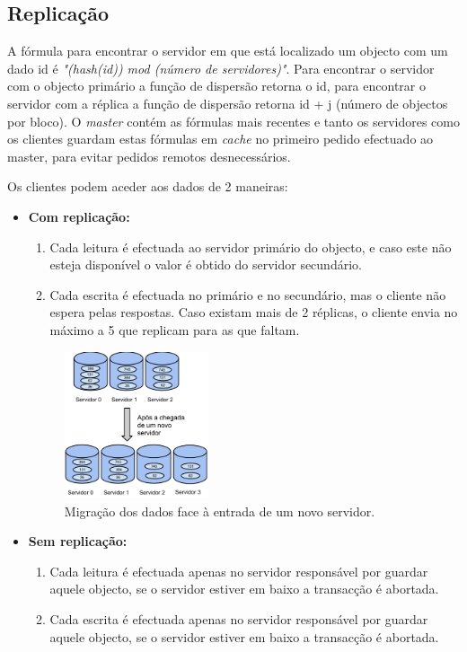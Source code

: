 \subsection{Replicação}

A fórmula para encontrar o servidor em que está localizado um objecto com um dado id é \textit{"(hash(id)) mod (número de servidores)"}. Para encontrar o servidor com o objecto primário a função de dispersão retorna o id, para encontrar o servidor com a réplica a função de dispersão retorna id + j (número de objectos por bloco).
O \textit{master} contém as fórmulas mais recentes e tanto os servidores como os clientes guardam estas fórmulas em \textit{cache} no primeiro pedido efectuado ao master, para evitar pedidos remotos desnecessários.

Os clientes podem aceder aos dados de 2 maneiras:

\begin{itemize}
\item \textbf{Com replicação:} 

\begin{enumerate}
\item Cada leitura é efectuada ao servidor primário do objecto, e caso este não esteja disponível o valor é obtido do servidor secundário.

\item Cada escrita é efectuada no primário e no secundário, mas o cliente não espera pelas respostas. Caso existam mais de 2 réplicas, o cliente envia no máximo a 5 que replicam para as que faltam.
\end{enumerate}

\begin{figure}
\centering
\includegraphics[width=0.4\textwidth]{migracao.png}
\caption{\label{fig:migracao}Migração dos dados face à entrada de um novo servidor.}
\end{figure}

\item \textbf{Sem replicação:}

\begin{enumerate}
\item Cada leitura é efectuada apenas no servidor responsável por guardar aquele objecto, se o servidor estiver em baixo a transacção é abortada.

\item Cada escrita é efectuada apenas no servidor responsável por guardar aquele objecto, se o servidor estiver em baixo a transacção é abortada.
\end{enumerate}
\end{itemize}